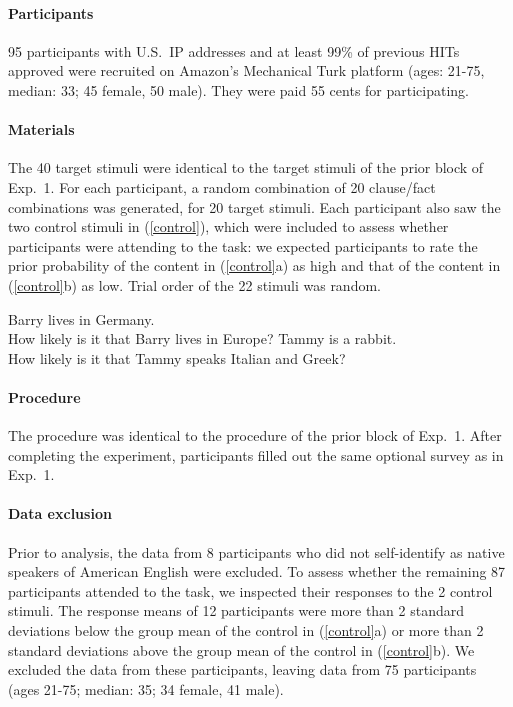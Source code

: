 \documentclass[11pt,fleqn]{article}
\newcommand{\6}{\mbox{$[\hspace*{-.6mm}[$}}
\newcommand{\9}{\mbox{$]\hspace*{-.6mm}]$}}
\begin{document}
\paragraph{Participants} 95 participants with U.S.\ IP addresses and at least 99\% of previous HITs approved were recruited on Amazon's Mechanical Turk platform (ages: 21-75, median: 33; 45 female, 50 male). They were paid 55 cents for participating. 

\paragraph{Materials} The 40 target stimuli were identical to the target stimuli of the prior block of Exp.~1. For each participant, a random combination of 20 clause/fact combinations was generated, for 20 target stimuli. Each participant also saw the two control stimuli in (\ref{control}), which were included to assess whether participants were attending to the task: we expected participants to rate the prior probability of the content in (\ref{control}a) as high and that of the content in (\ref{control}b) as low. Trial order of the 22 stimuli was random.

\begin{exe}
\ex\label{control2}
\begin{xlist}
 Barry lives in Germany. \\ How likely is it that Barry lives in Europe?
 Tammy is a rabbit. \\ How likely is it that Tammy speaks Italian and Greek?
\end{xlist}
\end{exe}

\paragraph{Procedure} The procedure was identical to the procedure of the prior block of Exp.~1. After completing the experiment, participants filled out the same optional survey as in Exp.~1.

\paragraph{Data exclusion} Prior to analysis, the data from 8 participants who did not self-identify as native speakers of American English were excluded. To assess whether the remaining 87 participants attended to the task, we inspected their responses to the 2 control stimuli. The response means of 12 participants were more than 2 standard deviations below the group mean of the control in (\ref{control}a) or more than 2 standard deviations above the group mean of the control in (\ref{control}b). We excluded the data from these participants, leaving data from 75 participants (ages 21-75; median: 35; 34 female, 41 male).
\end{document}
